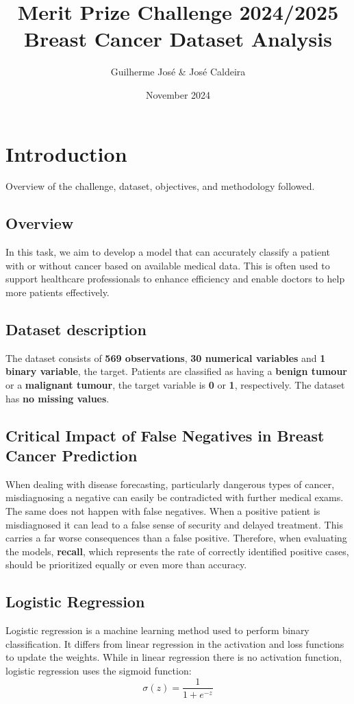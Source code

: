 \documentclass[a4paper,12pt]{article}
\title{Merit Prize Challenge 2024/2025 \\ \vspace{0.5cm} \large Breast Cancer Dataset Analysis}
\author{Guilherme José & José Caldeira}
\date{November 2024}
\begin{document}
\maketitle
\tableofcontents
\newpage

\section{Introduction}
\label{sec:introduction}
Overview of the challenge, dataset, objectives, and methodology followed.

\subsection{Overview}
In this task, we aim to develop a model that can accurately classify a patient with or without cancer based on available medical data. This is often used to support healthcare professionals to enhance efficiency and enable doctors to help more patients effectively.
\subsection{Dataset description}
The dataset consists of \textbf{569 observations}, \textbf{30 numerical variables} and \textbf{1 binary variable}, the target. Patients are classified as having a \textbf{benign tumour} or a \textbf{malignant tumour}, the target variable is \textbf{0} or \textbf{1}, respectively. The dataset has \textbf{no missing values}.
\subsection{Critical Impact of False Negatives in Breast Cancer Prediction}
When dealing with disease forecasting, particularly dangerous types of cancer, misdiagnosing  a negative can easily be contradicted with further medical exams. The same does not happen with false negatives. When a positive patient is misdiagnosed it can lead to a false sense of security and delayed treatment. This carries a far worse consequences than a false positive. Therefore, when evaluating the models, \textbf{recall}, which represents the rate of correctly identified positive cases, should be prioritized equally or even more than accuracy.
\subsection{Logistic Regression}
Logistic regression is a machine learning method used to perform binary classification. It differs from linear regression in the activation and loss functions to update the weights. While in linear regression there is no activation function, logistic regression uses the sigmoid function:
\[ \sigma(z) = \frac{1}{1 + e^{-z}} \]
\end{document}
